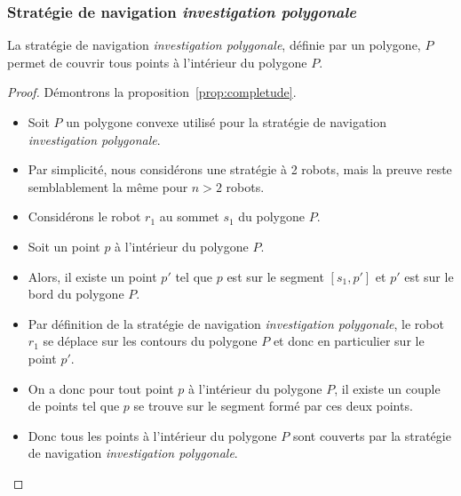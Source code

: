 \documentclass[francais,RandD]{rapportPFE}
\begin{document}
			\subsubsection*{Stratégie de navigation \textit{investigation polygonale}}
				\begin{Proposition}
					La stratégie de navigation \textit{investigation polygonale}, définie par un polygone, $P$ permet de couvrir tous points à l'intérieur du polygone $P$.
					\label{prop:completude}
				\end{Proposition}
				\begin{proof}
					Démontrons la proposition~\ref{prop:completude}.
					\begin{itemize}
						\item Soit $P$ un polygone convexe utilisé pour la stratégie de navigation \textit{investigation polygonale}.
						\item Par simplicité, nous considérons une stratégie à 2 robots, mais la preuve reste semblablement la même pour $n > 2$ robots.
						\item Considérons le robot $r_1$ au sommet $s_1$ du polygone $P$.
						\item Soit un point $p$ à l'intérieur du polygone $P$.
						\item Alors, il existe un point $p'$ tel que $p$ est sur le segment $[s_1, p']$ et $p'$ est sur le bord du polygone $P$.
						\item Par définition de la stratégie de navigation \textit{investigation polygonale}, le robot $r_1$ se déplace sur les contours du polygone $P$ et donc en particulier sur le point $p'$.
						\item On a donc pour tout point $p$ à l'intérieur du polygone $P$, il existe un couple de points tel que $p$ se trouve sur le segment formé par ces deux points.
						\item Donc tous les points à l'intérieur du polygone $P$ sont couverts par la stratégie de navigation \textit{investigation polygonale}.
					\end{itemize}
				\end{proof}
\end{document}
